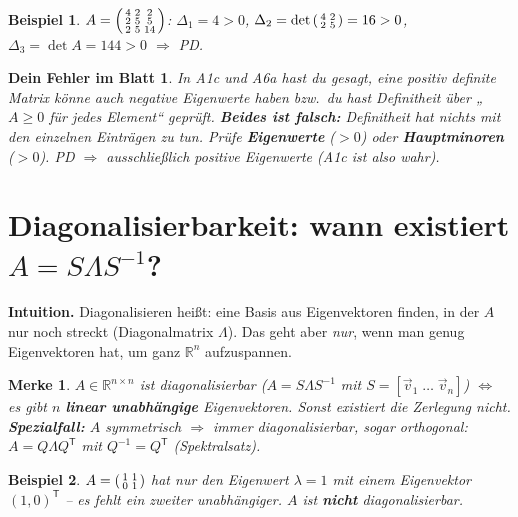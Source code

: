 \documentclass[a4paper,11pt]{article}
\newenvironment{psmallmatrix}{\left(\begin{smallmatrix}}{\end{smallmatrix}\right)}
\newcommand{\transp}{^{\mathsf{T}}}
\theoremstyle{def0}
\newtheorem*{merke}{\textcolor{good}{Merke}}
\newtheorem*{fehler}{\textcolor{bad}{Dein Fehler im Blatt}}
\newtheorem*{bsp}{Beispiel}
\begin{document}
\begin{bsp}
$A=\begin{psmallmatrix}4&2&2\\2&5&5\\2&5&14\end{psmallmatrix}$:\quad
$\Delta_1=4>0$,\;
$\Delta_2=\det\begin{psmallmatrix}4&2\\2&5\end{psmallmatrix}=16>0$,\;
$\Delta_3=\det A = 144>0$ $\Rightarrow$ PD.
\end{bsp}

\begin{fehler}
In A1c und A6a hast du gesagt, eine positiv definite Matrix \emph{könne auch negative
Eigenwerte haben} bzw.\ du hast Definitheit über „$A\ge0$ für jedes Element“ geprüft.
\textbf{Beides ist falsch:} Definitheit hat \emph{nichts} mit den einzelnen Einträgen zu
tun. Prüfe \textbf{Eigenwerte} ($>0$) oder \textbf{Hauptminoren} ($>0$). PD $\Rightarrow$
\emph{ausschließlich} positive Eigenwerte (A1c ist also \emph{wahr}).
\end{fehler}

\section{Diagonalisierbarkeit: wann existiert \texorpdfstring{$A=S\Lambda S^{-1}$}{A=SLS-1}?}

\textbf{Intuition.} Diagonalisieren heißt: eine Basis aus Eigenvektoren finden, in der
$A$ nur noch streckt (Diagonalmatrix $\Lambda$). Das geht aber \emph{nur}, wenn man
genug Eigenvektoren hat, um ganz $\mathbb{R}^n$ aufzuspannen.

\begin{merke}
$A\in\mathbb{R}^{n\times n}$ ist diagonalisierbar ($A=S\Lambda S^{-1}$ mit
$S=[\vec v_1\;\dots\;\vec v_n]$) $\iff$ es gibt $n$ \textbf{linear unabhängige}
Eigenvektoren. Sonst existiert die Zerlegung \emph{nicht}.\\
\textbf{Spezialfall:} $A$ symmetrisch $\Rightarrow$ \emph{immer} diagonalisierbar, sogar
orthogonal: $A=Q\Lambda Q\transp$ mit $Q^{-1}=Q\transp$ (Spektralsatz).
\end{merke}

\begin{bsp}
$A=\begin{psmallmatrix}1&1\\0&1\end{psmallmatrix}$ hat nur den Eigenwert $\lambda=1$ mit
\emph{einem} Eigenvektor $(1,0)\transp$ -- es fehlt ein zweiter unabhängiger.
$A$ ist \textbf{nicht} diagonalisierbar.
\end{bsp}
\end{document}
